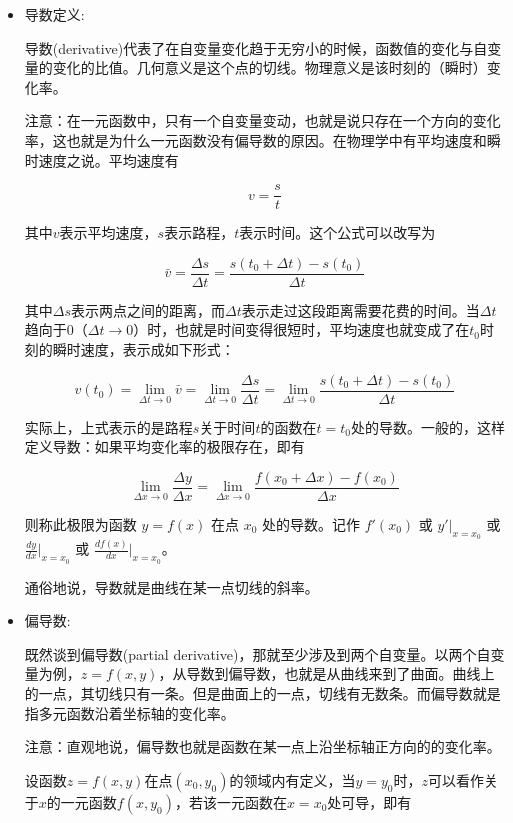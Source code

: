 \begin{itemize}\itemsep0em

		\item 导数定义:

			导数(derivative)代表了在自变量变化趋于无穷小的时候，函数值的变化与自变量的变化的比值。几何意义是这个点的切线。物理意义是该时刻的（瞬时）变化率。


		注意：在一元函数中，只有一个自变量变动，也就是说只存在一个方向的变化率，这也就是为什么一元函数没有偏导数的原因。在物理学中有平均速度和瞬时速度之说。平均速度有

		$$
		v=\frac{s}{t}
		$$

		其中$v$表示平均速度，$s$表示路程，$t$表示时间。这个公式可以改写为

		$$
		\bar{v}=\frac{\Delta s}{\Delta t}=\frac{s(t_0+\Delta t)-s(t_0)}{\Delta t}
		$$

		其中$\Delta s$表示两点之间的距离，而$\Delta t$表示走过这段距离需要花费的时间。当$\Delta t$趋向于0（$\Delta t \to 0$）时，也就是时间变得很短时，平均速度也就变成了在$t_0$时刻的瞬时速度，表示成如下形式：

		$$
		v(t_0)=\lim_{\Delta t \to 0}{\bar{v}}=\lim_{\Delta t \to 0}{\frac{\Delta s}{\Delta t}}=\lim_{\Delta t \to 0}{\frac{s(t_0+\Delta t)-s(t_0)}{\Delta t}}
		$$

		实际上，上式表示的是路程$s$关于时间$t$的函数在$t=t_0$处的导数。一般的，这样定义导数：如果平均变化率的极限存在，即有

		$$
		\lim_{\Delta x \to 0}{\frac{\Delta y}{\Delta x}}=\lim_{\Delta x \to 0}{\frac{f(x_0+\Delta x)-f(x_0)}{\Delta x}}
		$$

		则称此极限为函数 $y=f(x)$ 在点 $x_0$ 处的导数。记作 $f'(x_0)$ 或 $y'\vert_{x=x_0}$ 或 $\frac{dy}{dx}\vert_{x=x_0}$ 或 $\frac{df(x)}{dx}\vert_{x=x_0}$。

		通俗地说，导数就是曲线在某一点切线的斜率。

	\item 偏导数:

		既然谈到偏导数(partial derivative)，那就至少涉及到两个自变量。以两个自变量为例，$z=f(x,y)$，从导数到偏导数，也就是从曲线来到了曲面。曲线上的一点，其切线只有一条。但是曲面上的一点，切线有无数条。而偏导数就是指多元函数沿着坐标轴的变化率。 

		注意：直观地说，偏导数也就是函数在某一点上沿坐标轴正方向的的变化率。

		设函数$z=f(x,y)$在点$(x_0,y_0)$的领域内有定义，当$y=y_0$时，$z$可以看作关于$x$的一元函数$f(x,y_0)$，若该一元函数在$x=x_0$处可导，即有


\end{itemize}
